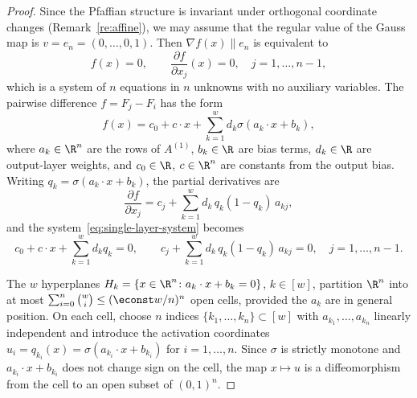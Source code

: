 \begin{proof}
Since the Pfaffian structure is invariant under orthogonal coordinate changes (Remark~\ref{re:affine}), we may assume that the regular value of the Gauss map is $v = e_n = (0,\ldots,0,1)$. Then $\nabla f(x) \parallel e_n$ is equivalent to
\begin{equation}\label{eq:single-layer-system}
  f(x) = 0, \qquad \frac{\partial f}{\partial x_j}(x) = 0, \quad j = 1,\ldots, n-1,
\end{equation}
which is a system of $n$ equations in $n$ unknowns with no auxiliary variables. The pairwise difference $f = F_j - F_i$ has the form
\begin{equation}\label{eq:single-layer-f}
  f(x) = c_0 + c\cdot x + \sum_{k=1}^w d_k \sigma(a_k\cdot x + b_k),
\end{equation}
where $a_k\in \R^n$ are the rows of $A^{(1)}$, $b_k\in \R$ are bias terms, $d_k\in \R$ are output-layer weights, and $c_0\in \R$, $c\in \R^n$ are constants from the output bias. Writing $q_k = \sigma(a_k\cdot x + b_k)$, the partial derivatives are
\begin{equation*}
  \frac{\partial f}{\partial x_j} = c_j + \sum_{k=1}^w d_k\, q_k(1-q_k)\, a_{kj},
\end{equation*}
and the system~\eqref{eq:single-layer-system} becomes
\begin{equation}\label{eq:single-layer-expanded}
  c_0 + c\cdot x + \sum_{k=1}^w d_k q_k = 0, \qquad c_j + \sum_{k=1}^w d_k\, q_k(1-q_k)\, a_{kj} = 0, \quad j=1,\ldots,n-1.
\end{equation}

The $w$ hyperplanes $H_k = \{x\in \R^n \colon a_k\cdot x + b_k = 0\}$, $k\in [w]$, partition $\R^n$ into at most $\sum_{i=0}^n \binom{w}{i} \leq (\econst w/n)^n$ open cells, provided the $a_k$ are in general position. On each cell, choose $n$ indices $\{k_1,\ldots,k_n\}\subset [w]$ with $a_{k_1},\ldots,a_{k_n}$ linearly independent and introduce the activation coordinates $u_i = q_{k_i}(x) = \sigma(a_{k_i}\cdot x + b_{k_i})$ for $i = 1,\ldots, n$. Since $\sigma$ is strictly monotone and $a_{k_i}\cdot x + b_{k_i}$ does not change sign on the cell, the map $x\mapsto u$ is a diffeomorphism from the cell to an open subset of $(0,1)^n$.


\end{proof}
